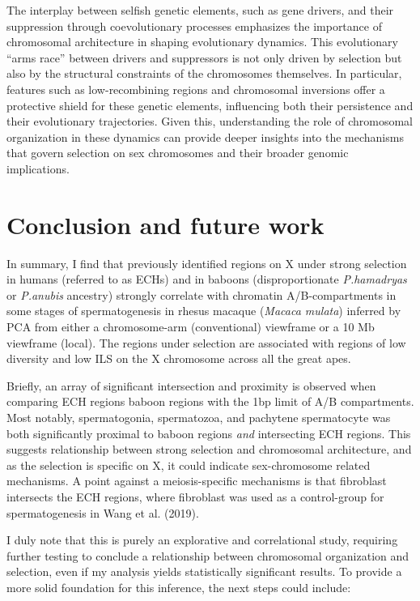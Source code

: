 \documentclass[
  11pt,
  a4paper,
]{scrbook}
\begin{document}
The interplay between selfish genetic elements, such as gene drivers,
and their suppression through coevolutionary processes emphasizes the
importance of chromosomal architecture in shaping evolutionary dynamics.
This evolutionary ``arms race'' between drivers and suppressors is not
only driven by selection but also by the structural constraints of the
chromosomes themselves. In particular, features such as low-recombining
regions and chromosomal inversions offer a protective shield for these
genetic elements, influencing both their persistence and their
evolutionary trajectories. Given this, understanding the role of
chromosomal organization in these dynamics can provide deeper insights
into the mechanisms that govern selection on sex chromosomes and their
broader genomic implications.

\chapter{Conclusion and future work}\label{conclusion-and-future-work}

In summary, I find that previously identified regions on X under strong
selection in humans (referred to as ECHs) and in baboons
(disproportionate \emph{P.hamadryas} or \emph{P.anubis} ancestry)
strongly correlate with chromatin A/B-compartments in some stages of
spermatogenesis in rhesus macaque (\emph{Macaca mulata}) inferred by PCA
from either a chromosome-arm (conventional) viewframe or a 10 Mb
viewframe (local). The regions under selection are associated with
regions of low diversity and low ILS on the X chromosome across all the
great apes.

Briefly, an array of significant intersection and proximity is observed
when comparing ECH regions baboon regions with the 1bp limit of A/B
compartments. Most notably, spermatogonia, spermatozoa, and pachytene
spermatocyte was both significantly proximal to baboon regions
\emph{and} intersecting ECH regions. This suggests relationship between
strong selection and chromosomal architecture, and as the selection is
specific on X, it could indicate sex-chromosome related mechanisms. A
point against a meiosis-specific mechanisms is that fibroblast
intersects the ECH regions, where fibroblast was used as a control-group
for spermatogenesis in Wang et al. (2019).

I duly note that this is purely an explorative and correlational study,
requiring further testing to conclude a relationship between chromosomal
organization and selection, even if my analysis yields statistically
significant results. To provide a more solid foundation for this
inference, the next steps could include:
\end{document}
